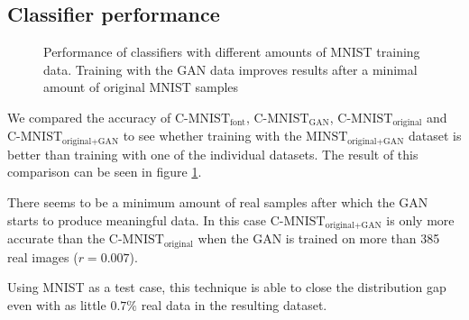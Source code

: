 \documentclass[10pt,twocolumn,letterpaper]{article}
\begin{document}
\subsection{Classifier performance}
\begin{figure}
\begin{center}
\end{center}
   \caption{Performance of classifiers with different amounts of MNIST training data. Training with the GAN data improves results after a minimal amount of original MNIST samples}
\label{fig:graph-results}
\end{figure}

We compared the accuracy of $\text{C-MNIST}_\text{font}$, $\text{C-MNIST}_\text{GAN}$, $\text{C-MNIST}_\text{original}$ and $\text{C-MNIST}_\text{original+GAN}$ to see whether training with the $\text{MINST}_\text{original+GAN}$ dataset is better than training with one of the individual datasets. The result of this comparison can be seen in figure \ref{fig:graph-results}.

There seems to be a minimum amount of real samples after which the GAN starts to produce meaningful data. In this case $\text{C-MNIST}_\text{original+GAN}$ is only more accurate than the $\text{C-MNIST}_\text{original}$ when the GAN is trained on more than 385 real images ($r = 0.007$).

Using MNIST as a test case, this technique is able to close the distribution gap even with as little $0.7\%$ real data in the resulting dataset.

\end{document}
